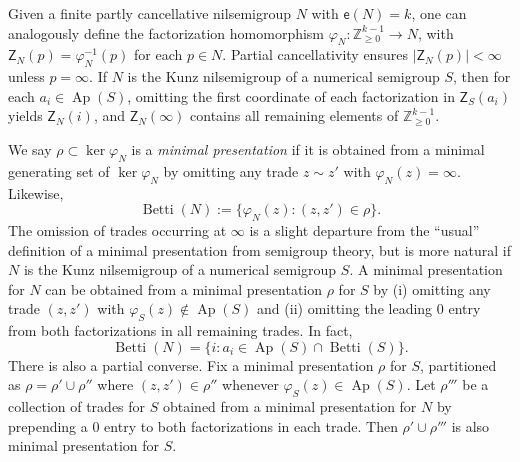 \documentclass[ALCO]{cedram}
\newcommand\ZZ{\mathbb{Z}}
\DeclareMathOperator\Betti{Betti}
\DeclareMathOperator\Ap{Ap}
\begin{document}
Given a finite partly cancellative nilsemigroup $N$ with $\mathsf e(N) = k$, one can analogously define the factorization homomorphism $\varphi_N:\ZZ_{\ge 0}^{k-1} \to N$, with $\mathsf Z_N(p) = \varphi_N^{-1}(p)$ for each $p \in N$.  Partial cancellativity ensures $|\mathsf Z_N(p)| < \infty$ unless $p = \infty$.  
If $N$ is the Kunz nilsemigroup of a numerical semigroup $S$, then for each $a_i \in \Ap(S)$, omitting the first coordinate of each factorization in $\mathsf Z_S(a_i)$ yields $\mathsf Z_N(i)$, and $\mathsf Z_N(\infty)$ contains all remaining elements of $\ZZ_{\ge 0}^{k-1}$.  

We say $\rho \subset \ker\varphi_N$ is a \emph{minimal presentation} if it is obtained from a minimal generating set of $\ker\varphi_N$ by omitting any trade $z \sim z'$ with $\varphi_N(z) = \infty$.  Likewise, 
$$\Betti(N) := \{\varphi_N(z) : (z, z') \in \rho\}.$$
The omission of trades occurring at $\infty$ is a slight departure from the ``usual'' definition of a minimal presentation from semigroup theory, but is more natural if $N$ is the Kunz nilsemigroup of a numerical semigroup $S$.  A minimal presentation for $N$ can be obtained from a minimal presentation $\rho$ for $S$ by (i) omitting any trade $(z, z')$ with $\varphi_S(z) \notin \Ap(S)$ and (ii) omitting the leading 0 entry from both factorizations in all remaining trades.  In fact, $$\Betti(N) = \{i : a_i \in \Ap(S) \cap \Betti(S)\}.$$
There is also a partial converse.  Fix a minimal presentation $\rho$ for $S$, partitioned as $\rho = \rho' \cup \rho''$ where $(z, z') \in \rho''$ whenever $\varphi_S(z) \in \Ap(S)$.  Let $\rho'''$ be a collection of trades for $S$ obtained from a minimal presentation for $N$ by prepending a 0 entry to both factorizations in each trade.  Then $\rho' \cup \rho'''$ is also minimal presentation for $S$.  
\end{document}
